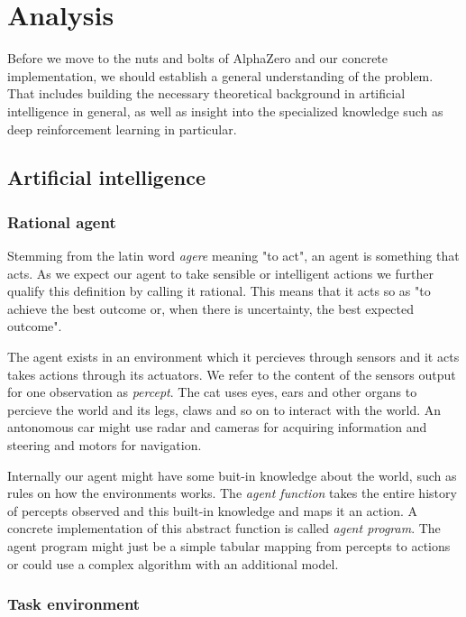 \chapter{Analysis}
Before we move to the nuts and bolts of AlphaZero and our concrete implementation, we should establish a general understanding of the problem. That includes building the necessary theoretical background in artificial intelligence in general, as well as insight into the specialized knowledge such as deep reinforcement learning in particular.

\section{Artificial intelligence}

\subsection{Rational agent}
Stemming from the latin word \textit{agere} meaning "to act", an agent is something that acts. As we expect our agent to take sensible or intelligent actions we further qualify this definition by calling it rational. This means that it acts so as "to achieve the best outcome or, when there is uncertainty, the best expected outcome". \cite[p. 36]{russell_artificial_2021}

The agent exists in an environment which it percieves through sensors and it acts takes actions through its actuators. We refer to the content of the sensors output for one observation as \textit{percept}. The cat uses eyes, ears and other organs to percieve the world and its legs, claws and so on to interact with the world. An antonomous car might use radar and cameras for acquiring information and steering and motors for navigation.

Internally our agent might have some buit-in knowledge about the world, such as rules on how the environments works. The \textit{agent function} takes the entire history of percepts observed and this built-in knowledge and maps it an action. A concrete implementation of this abstract function is called \textit{agent program}. The agent program might just be a simple tabular mapping from percepts to actions or could use a complex algorithm with an additional model.

\subsection{Task environment}

